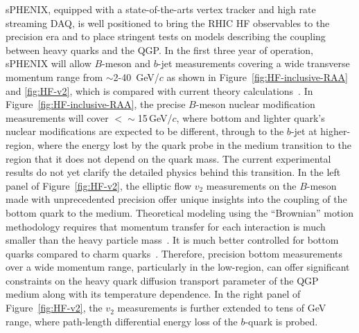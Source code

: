 sPHENIX, equipped with a state-of-the-arts vertex tracker and high rate streaming DAQ, is well positioned to bring the RHIC HF observables to the precision era and to place stringent tests on models describing the coupling between heavy quarks and the QGP. In the first three year of operation, sPHENIX will allow $B$-meson and $b$-jet measurements covering a wide transverse momentum range from $\sim$2-40~GeV/$c$ as shown in Figure~\ref{fig:HF-inclusive-RAA} and \ref{fig:HF-v2}, which is compared with current  theory calculations~\cite{Duke,TAMU,PHSD,CUJET,Huang:2013vaa,Ke:2020nsm}. 
In Figure~\ref{fig:HF-inclusive-RAA}, the precise $B$-meson nuclear modification measurements will cover \pT $<\sim$15\,GeV/$c$, where bottom and lighter quark's nuclear modifications are expected to be different, through to the  $b$-jet at higher-\pT region, where the energy lost by the quark probe in the medium transition to the region that it does not depend on the quark mass. The current experimental results do not yet clarify the detailed physics behind this transition. 
In the left panel of Figure~\ref{fig:HF-v2}, the elliptic flow $v_2$ measurements on the $B$-meson made with unprecedented precision offer unique insights into the coupling of the bottom quark to the medium.
Theoretical modeling using the ``Brownian'' motion methodology requires that momentum transfer for each interaction is much smaller than the heavy particle mass~\cite{Moore:2004tg}. It is much better controlled for bottom quarks compared to charm quarks~\cite{Das:2013kea}. Therefore, precision bottom measurements over a wide momentum range, particularly in the low-\pT region, can offer significant constraints on the heavy quark diffusion transport parameter of the QGP medium along with its temperature dependence. In the right panel of Figure~\ref{fig:HF-v2}, the $v_2$ measurements is further extended to tens of GeV range, where path-length differential energy loss of the $b$-quark is probed.


